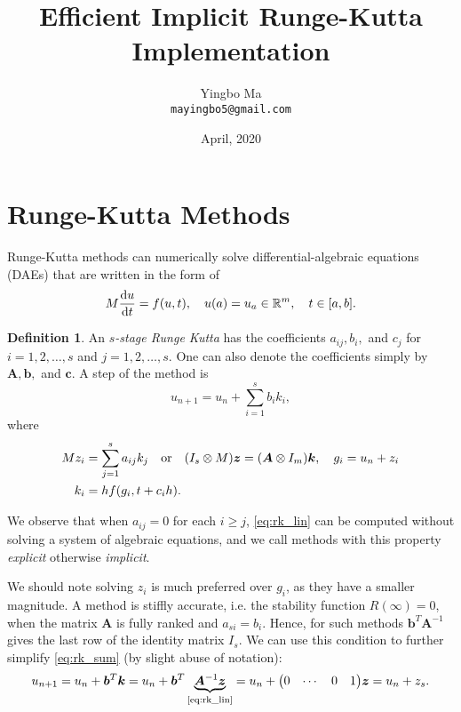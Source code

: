 \documentclass[a4paper,9pt]{article}
\theoremstyle{definition}
\newtheorem{definition}{Definition}[section]
\theoremstyle{remark}
\begin{document}
\author{Yingbo Ma\\
        \tt{mayingbo5@gmail.com}}
\title{Efficient Implicit Runge-Kutta Implementation}
\date{April, 2020}

\maketitle


\section{Runge-Kutta Methods}
Runge-Kutta methods can numerically solve differential-algebraic equations
(DAEs) that are written in the form of
\begin{equation}
  M \dv{u}{t} = f(u, t),\quad u(a)=u_a \in \mathbb{R}^m, \quad t\in [a, b].
\end{equation}

\begin{definition} \label{def:rk}
  An \emph{$s$-stage Runge Kutta} has the coefficients $a_{ij}, b_i,$ and $c_j$
  for $i=1,2,\dots,s$ and $j=1,2,\dots,s$. One can also denote the coefficients
  simply by $\bm{A}, \bm{b},$ and $\bm{c}$. A step of the method is
  \begin{equation} \label{eq:rk_sum}
    u_{n+1} = u_n + \sum_{i=1}^s b_i k_i,
  \end{equation}
  where
  \begin{align} \label{eq:rk_lin}
    M z_i &= \sum_{j=1}^s a_{ij}k_j\qq{or} (I_s \otimes M) \bm{z} =
    (\bm{A}\otimes I_m)\bm{k}, \quad g_i = u_n + z_i \\
    k_i &= hf(g_i, t+c_ih).
  \end{align}
\end{definition}

We observe that when $a_{ij} = 0$ for each $i\ge j$, \cref{eq:rk_lin} can be
computed without solving a system of algebraic equations, and we call methods
with this property \emph{explicit} otherwise \emph{implicit}.

We should note solving $z_i$ is much preferred over $g_i$, as they have a
smaller magnitude. A method is stiffly accurate, i.e. the stability function
$R(\infty) = 0$, when the matrix $\bm{A}$ is fully ranked and $a_{si} = b_i$.
Hence, for such methods $\bm{b}^T\bm{A}^{-1}$ gives the last row of the identity
matrix $I_s$. We can use this condition to further simplify \cref{eq:rk_sum} (by
slight abuse of notation):
\begin{equation} \label{eq:rk_sim}
  u_{n+1} = u_n + \bm{b}^T\bm{k} = u_n +
  \bm{b}^T\underbrace{\bm{A}^{-1}\bm{z}}_\text{\cref{eq:rk_lin}} = u_n +
  \mqty(0 & \cdots & 0 & 1)\bm{z} = u_n + z_s.
\end{equation}
\end{document}
